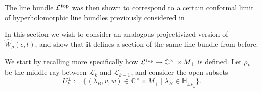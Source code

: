 \documentclass[pdftex]{sigma}
\numberwithin{equation}{section}
\begin{document}
The line bundle $\mathcal{L}^{{\rm top}}$ was then shown to correspond to a certain conformal limit of hyperholomorphic line bundles previously considered in \cite{APP,Neitzke_hyperhol}.

In this section we wish to consider an analogous projectivized version of $\hat{W}_{\rho}(\epsilon,t)$, and show that it defines a section of the same line bundle from before.

We start by recalling more specifically how $\mathcal{L}^{{\rm top}}\to \mathbb{C}^{\times}\times M_+$ is defined. Let $\rho_k$ be the middle ray between $\mathcal{L}_k$ and $\mathcal{L}_{k-1}$, and consider the open subsets
\begin{equation*}
 U_k^{\pm}:=\{(\lambda_B,v,w)\in \mathbb{C}^{\times}\times M_{+} \mid \lambda_B\in \mathbb{H}_{\pm \rho_k}\}.
\end{equation*}
\end{document}
